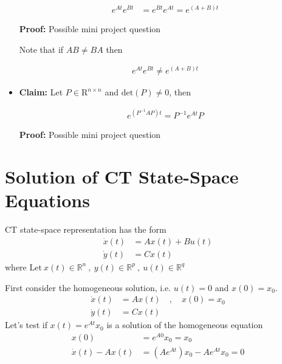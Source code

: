 \documentclass[twoside]{article}
\begin{document}
\begin{itemize}
\begin{align*}
	e^{A t} e^{B t} &= e^{B t} e^{A t} = e^{(A + B) t} 
\end{align*}

\textbf{Proof:} Possible mini project question

\par 

Note that if $A B \neq B A$ then

\begin{align*}
	e^{A t} e^{B t} \neq e^{(A + B) t} 
\end{align*}

\item \textbf{Claim:} Let $P \in \mathrm{R}^{n \times n}$ and
 $\mathrm{det}(P) \neq 0$, then

\begin{align*}
	e^{\left(P^{-1} A P \right) t} = P^{-1} e^{A t} P
\end{align*}

\textbf{Proof:} Possible mini project question

\end{itemize}

\section{Solution of CT State-Space Equations}

CT state-space representation has the form
%
\begin{align*}
  \dot{x}(t) &= A x(t) + B u(t)
\\
 \dot{y}(t) &= C x(t) 
\end{align*}
%
where $\mathrm{Let} \ x(t) \in \mathbb{R}^n \ , \ y(t) \in \mathbb{R}^p \ ,\  u(t) \in
  \mathbb{R}^q$

First consider the homogeneous solution, i.e. $u(t) = 0$ and $x(0) =
x_0$.
%
\begin{align*}
  \dot{x}(t) &= A x(t) \quad , \quad x(0) = x_0
\\
 \dot{y}(t) &= C x(t) 
\end{align*}
%
Let's test if $x(t) = e^{A t} x_0$ is a solution of the homogeneous 
equation
%
%
\begin{align*}
  x(0) &= e^{A 0} x_0 = x_0
  \\
  \dot{x}(t) - A x(t) &= \left( A e^{At} \right) x_0 - A e^{At} x_0 = 0
\end{align*}
%
\end{document}
